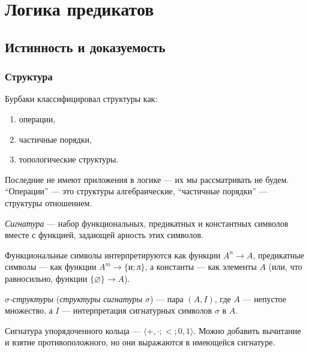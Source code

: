 \documentclass[a4paper,11pt]{article}
\begin{document}
\maketitle

\tableofcontents

\section{Логика предикатов}

\subsection{Истинность и доказуемость}

\subsubsection{Структура}

Бурбаки классифицировал структуры как:
\begin{enumerate}
	\item операции,
	\item частичные порядки,
	\item топологические структуры.
\end{enumerate}

Последние не имеют приложения в логике --- их мы рассматривать не будем. ``Операции'' --- это структуры алгебраические, ``частичные порядки'' --- структуры отношением.

\begin{definition}
	\emph{Сигнатура} --- набор функциональных, предикатных и константных символов вместе с функцией, задающей арность этих символов.

	Функциональные символы интерпретируются как функции $A^n \to A$, предикатные символы --- как функции $A^m \to \{\text{и}; \text{л}\}$, а константы --- как элементы $A$ (или, что равносильно, функции $\{\varnothing\} \to A$).

	\emph{$\sigma$-структуры} (\emph{структуры сигнатуры $\sigma$}) --- пара $(A, I)$, где $A$ --- непустое множество, а $I$ --- интерпретация сигнатурных символов $\sigma$ в $A$.
\end{definition}

\begin{exmpl}
	Сигнатура упорядоченного кольца --- $\langle {+}, {\cdot}; {<}; 0, 1 \rangle$. Можно добавить вычитание и взятие противоположного, но они выражаются в имеющейся сигнатуре.
\end{exmpl}
\end{document}
